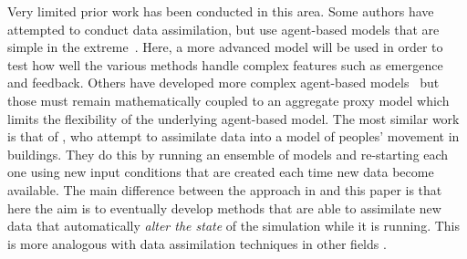 \documentclass[runningheads]{llncs}
\begin{document}
%

Very limited prior work has been conducted in this area. Some authors have attempted to conduct data assimilation, but use agent-based models that are simple in the extreme~\cite{malleson_forecasting_2017,ward_dynamic_2016}. Here, a more advanced model will be used in order to test how well the various methods handle complex features such as emergence and feedback. Others have developed more complex agent-based models~\cite{flotterod_bayesian_2011} but those must remain mathematically coupled to an aggregate proxy model which limits the flexibility of the underlying agent-based model. The most similar work is that of \cite{wang_data_2015}, who attempt to assimilate data into a model of peoples' movement in buildings. They do this by running an ensemble of models and re-starting each one using new input conditions that are created each time new data become available. The main difference between the approach in \cite{wang_data_2015} and this paper is that here the aim is to eventually develop methods that are able to assimilate new data that automatically \textit{alter the state} of the simulation while it is running. This is more analogous with data assimilation techniques in other fields \cite{kalnay_atmospheric_2003}.

\end{document}

